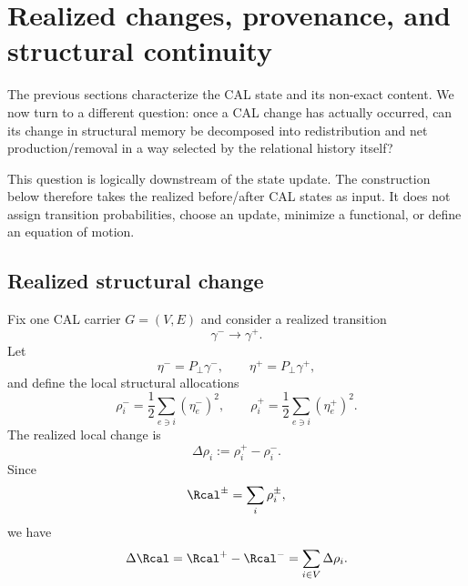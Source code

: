 
\section{Realized changes, provenance, and structural continuity}
\label{sec:balance}

The previous sections characterize the CAL state and its non-exact content. We now turn to a different question: once a CAL change has actually occurred, can its change in structural memory be decomposed into redistribution and net production/removal in a way selected by the relational history itself?

This question is logically downstream of the state update. The construction below therefore takes the realized before/after CAL states as input. It does not assign transition probabilities, choose an update, minimize a functional, or define an equation of motion.

\subsection{Realized structural change}

Fix one CAL carrier $G=(V,E)$ and consider a realized transition
\begin{equation}
\gamma^-\longrightarrow\gamma^+.
\end{equation}
Let
\begin{equation}
\eta^- = P_\perp\gamma^- ,
\qquad
\eta^+ = P_\perp\gamma^+ ,
\end{equation}
and define the local structural allocations
\begin{equation}
\rho_i^- = \frac12\sum_{e\ni i}(\eta_e^-)^2,
\qquad
\rho_i^+ = \frac12\sum_{e\ni i}(\eta_e^+)^2.
\end{equation}
The realized local change is
\begin{equation}
\Delta\rho_i:=\rho_i^+-\rho_i^-.
\label{eq:delta-rho-def}
\end{equation}
Since
\begin{equation}
\Rcal^{\pm}=\sum_i\rho_i^{\pm},
\end{equation}
we have
\begin{equation}
\Delta\Rcal
=\Rcal^+-\Rcal^-
=\sum_{i\in V}\Delta\rho_i.
\label{eq:delta-R-sum}
\end{equation}

